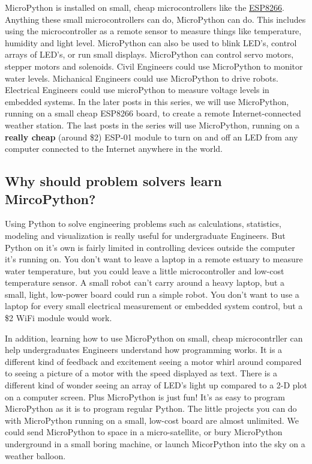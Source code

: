 \documentclass{book}
\begin{document}
    
        MicroPython is installed on small, cheap microcontrollers like the
\href{https://learn.adafruit.com/adafruit-feather-huzzah-esp8266}{ESP8266}.
Anything these small microcontrollers can do, MicroPython can do. This
includes using the microcontroller as a remote sensor to measure things
like temperature, humidity and light level. MicroPython can also be used
to blink LED's, control arrays of LED's, or run small displays.
MicroPython can control servo motors, stepper motors and solenoids.
Civil Engineers could use MicroPython to monitor water levels.
Michanical Engineers could use MicroPython to drive robots. Electrical
Engineers could use microPython to measure voltage levels in embedded
systems. In the later posts in this series, we will use MicroPython,
running on a small cheap ESP8266 board, to create a remote
Internet-connected weather station. The last posts in the series will
use MicroPython, running on a \textbf{really cheap} (around \$2) ESP-01
module to turn on and off an LED from any computer connected to the
Internet anywhere in the world.
    




    
        \subsection{Why should problem solvers learn
MircoPython?}\label{why-should-problem-solvers-learn-mircopython}
    




    
        Using Python to solve engineering problems such as calculations,
statistics, modeling and visualization is really useful for
undergraduate Engineers. But Python on it's own is fairly limited in
controlling devices outside the computer it's running on. You don't want
to leave a laptop in a remote estuary to measure water temperature, but
you could leave a little microcontroller and low-cost temperature
sensor. A small robot can't carry around a heavy laptop, but a small,
light, low-power board could run a simple robot. You don't want to use a
laptop for every small electrical measurement or embedded system
control, but a \$2 WiFi module would work.

In addition, learning how to use MicroPython on small, cheap
microcontrller can help undergraduates Engineers understand how
programming works. It is a different kind of feedback and excitement
seeing a motor whirl around compared to seeing a picture of a motor with
the speed displayed as text. There is a different kind of wonder seeing
an array of LED's light up compared to a 2-D plot on a computer screen.
Plus MicroPython is just fun! It's as easy to program MicroPython as it
is to program regular Python. The little projects you can do with
MicroPython running on a small, low-cost board are almost unlimited. We
could send MicroPython to space in a micro-satellite, or bury
MicroPython underground in a small boring machine, or launch MicorPython
into the sky on a weather balloon.
    
\end{document}
